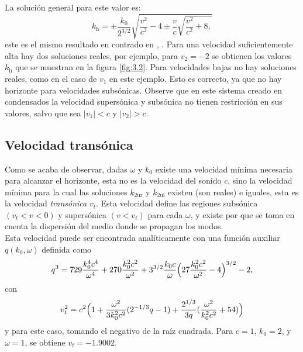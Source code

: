  La solución general para este valor es:
 \begin{equation}\label{ec:horizonte}
 k_{\text{h}}=\pm\frac{k_0}{2^{3/2}}\sqrt{\frac{v^2}{c^2}-4\pm\frac{v}{c}\sqrt{\frac{v^2}{c^2}+8,}}
 \end{equation}
este es el mismo resultado en contrado en \citep{2012Larre}, \citep{2009RParentani}. Para una velocidad suficientemente alta hay dos soluciones reales, por ejemplo, para $v_2=-2$ se obtienen los valores $k_{\text{h}}$ que se muestran en la figura \ref{fig:3.2}. Para velocidades bajas no hay soluciones reales, como en el caso de $v_1$ en este ejemplo. Esto es correcto, ya que no hay horizonte para velocidades subsónicas. Observe que en este sistema creado en condensados la velocidad supers\'{o}nica y subs\'{o}nica no tienen restricci\'{o}n en sus valores, salvo que sea $|v_1|<c$ y $|v_2|>c$.


\subsection{Velocidad trans\'{o}nica}
Como se acaba de observar, dadas $\omega$ y $k_0$ existe una velocidad mínima necesaria para alcanzar el horizonte, esta no es la velocidad del sonido $c$, sino la velocidad mínima para la cual las soluciones $k_{2\text{ur}}$ y $k_{2\text{ul}}$ existen (son reales) e iguales, esta es la velocidad\textit{ transónica} $v_t$. Esta velocidad define las regiones subsónica $(v_t <v <0)$ y supersónica $(v <v_t)$ para cada $\omega$, y existe por que se toma en cuenta la dispersi\'{o}n del medio donde se propagan los modos.\\

Esta velocidad puede ser encontrada anal\'{i}ticamente con una funci\'{o}n auxiliar $q(k_0,\omega)$ definida como
\begin{equation}
q^3=729\frac{k_0^4c^4}{\omega^4}+270\frac{k_0^2c^2}{\omega^2}+3^{3/2}\frac{k_0c}{\omega}\Bigl(27\frac{k_0^2c^2}{\omega^2}-4\Bigr)^{3/2}-2,
\end{equation}
con 
\begin{equation}
v_t^2=c^2\Bigl(1+\frac{\omega^2}{3k_0^2c^2}(2^{-1/3}q-1)+\frac{2^{1/3}}{3q}(\frac{\omega^2}{k_0^2c^2}+54)\Bigr)
\end{equation}
 y para este caso, tomando el negativo de la ra\'{i}z cuadrada. Para $c=1$, $k_0=2$, y $\omega=1$, se obtiene $v_t=-1.9002.$
 
 
